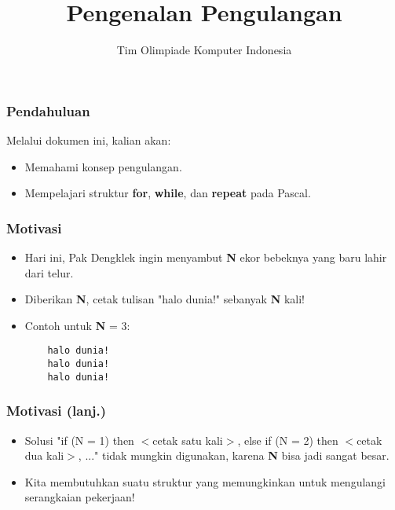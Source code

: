 

\title{Pengenalan Pengulangan}
\author{Tim Olimpiade Komputer Indonesia}
\date{}



\begin{frame}
\titlepage
\end{frame}

\begin{frame}
\frametitle{Pendahuluan}
Melalui dokumen ini, kalian akan:
\begin{itemize}
  \item Memahami konsep pengulangan.
  \item Mempelajari struktur \textbf{for}, \textbf{while}, dan \textbf{repeat} pada Pascal.
\end{itemize}
\end{frame}

\begin{frame}[fragile]
\frametitle{Motivasi}
\begin{itemize}
  \item Hari ini, Pak Dengklek ingin menyambut \textbf{N} ekor bebeknya yang baru lahir dari telur.
  \item Diberikan \textbf{N}, cetak tulisan "halo dunia!" sebanyak \textbf{N} kali!
  \item Contoh untuk \textbf{N} = 3:
  \begin{lstlisting}
    halo dunia!
    halo dunia!
    halo dunia!
  \end{lstlisting}
\end{itemize}
\end{frame}

\begin{frame}
\frametitle{Motivasi (lanj.)}
\begin{itemize}
  \item Solusi "if (N = 1) then $<$cetak satu kali$>$, else if (N = 2) then $<$cetak dua kali$>$, ..." tidak mungkin digunakan, karena \textbf{N} bisa jadi sangat besar.
  \item Kita membutuhkan suatu struktur yang memungkinkan untuk mengulangi serangkaian pekerjaan!
\end{itemize}
\end{frame}

